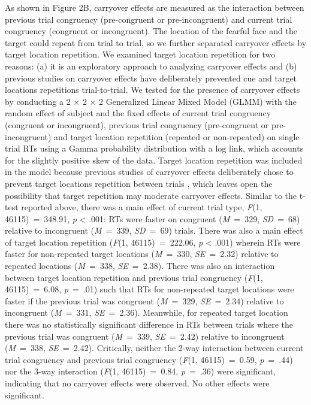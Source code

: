 \documentclass[issue,twocolumn,empirical, authordate,10pt]{jote-new-article}
\begin{document}
As shown in Figure 2B, carryover effects are measured as the interaction between previous trial congruency (pre-congruent or pre-incongruent) and current trial congruency (congruent or incongruent). The location of the fearful face and the target could repeat from trial to trial, so we further separated carryover effects by target location repetition. We examined target location repetition for two reasons: (a) it is an exploratory approach to analyzing carryover effects and (b) previous studies on carryover effects \parencite{Gladwin2019a} have deliberately prevented cue and target locations repetitions trial-to-trial. We tested for the presence of carryover effects by conducting a 2 × 2 × 2 Generalized Linear Mixed Model (GLMM) with the random effect of subject and the fixed effects of current trial congruency (congruent or incongruent), previous trial congruency (pre-congruent or pre-incongruent) and target location repetition (repeated or non-repeated) on single trial RTs using a Gamma probability distribution with a log link, which accounts for the slightly positive skew of the data. Target location repetition was included in the model because previous studies of carryover effects deliberately chose to prevent target locations repetition between trials \parencite{Gladwin2019a}, which leaves open the possibility that target repetition may moderate carryover effects. Similar to the t-test reported above, there was a main effect of current trial type, \emph{F}(1, 46115)~=~348.91, \emph{p }< .001: RTs were faster on congruent (\emph{M}~=~329, \emph{SD}\emph{}~=~68) relative to incongruent (\emph{M}~=~339, \emph{SD}~=~69) trials. There was also a main effect of target location repetition (\emph{F}(1, 46115)~=~222.06, \emph{p }< .001) wherein RTs were faster for non-repeated target locations (\emph{M}\emph{}~=~330, \emph{SE}~=~2.32) relative to repeated locations (\emph{M}\emph{}~=~338, \emph{SE}~=~2.38). There was also an interaction between target location repetition and previous trial congruency (\emph{F}(1, 46115)~=~6.08, \emph{p}~=~.01) such that RTs for non-repeated target locations were faster if the previous trial was congruent (\emph{M}~=~329, \emph{SE}~=~2.34) relative to incongruent (\emph{M}~=~331, \emph{SE}~=~2.36). Meanwhile, for repeated target location there was no statistically significant difference in RTs between trials where the previous trial was congruent (\emph{M}~=~339, \emph{SE}~=~2.42) relative to incongruent (\emph{M}~=~338, \emph{SE}~=~2.42). Critically, neither the 2-way interaction between current trial congruency and previous trial congruency (\emph{F}(1, 46115)~=~0.59, \emph{p}~=~.44) nor the 3-way interaction (\emph{F}(1, 46115)~=~0.84, \emph{p}~=~.36) were significant, indicating that no carryover effects were observed. No other effects were significant.
\end{document}
